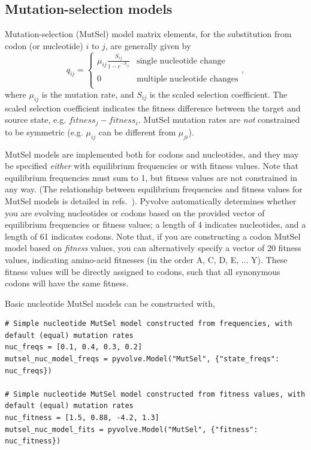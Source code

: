 \documentclass{article}
\begin{document}
\subsection{Mutation-selection models}\label{sec:mutsel_basic}
Mutation-selection (MutSel) model \citep{HB98} matrix elements, for the substitution from codon (or nucleotide) $i$ to $j$, are generally given by 
\begin{equation}
q_{ij} = \left\{ 
\begin{array}{rl}
	\mu_{ij} \frac{S_{ij}}{1-e^{-S_{ij}}} &\text{single nucleotide change} \\\\
	0                                  &\text{multiple nucleotide changes} \\             
\end{array} \right.,
\end{equation} where $\mu_{ij}$ is the mutation rate, and $S_{ij}$ is the scaled selection coefficient. The scaled selection coefficient indicates the fitness difference between the target and source state, e.g. $fitness_j - fitness_i$. MutSel mutation rates are \emph{not} constrained to be symmetric (e.g. $\mu_{ij}$ can be different from $\mu_{ji}$). 

MutSel models are implemented both for codons and nucleotides, and they may be specified \emph{either} with equilibrium frequencies or with fitness values. Note that equilibrium frequencies must sum to 1, but fitness values are not constrained in any way. (The relationship between equilibrium frequencies and fitness values for MutSel models is detailed in refs.\ \citep{HB98,SpielmanWilke2015}). Pyvolve automatically determines whether you are evolving nucleotides or codons based on the provided vector of equilibrium frequencies or fitness values; a length of 4 indicates nucleotides, and a length of 61 indicates codons. Note that, if you are constructing a codon MutSel model based on \emph{fitness} values, you can alternatively specify a vector of 20 fitness values, indicating amino-acid fitnesses (in the order A, C, D, E, ... Y). These fitness values will be directly assigned to codons, such that all synonymous codons will have the same fitness.


Basic nucleotide MutSel models can be constructed with,
\begin{lstlisting}
# Simple nucleotide MutSel model constructed from frequencies, with default (equal) mutation rates
nuc_freqs = [0.1, 0.4, 0.3, 0.2]
mutsel_nuc_model_freqs = pyvolve.Model("MutSel", {"state_freqs": nuc_freqs})

# Simple nucleotide MutSel model constructed from fitness values, with default (equal) mutation rates
nuc_fitness = [1.5, 0.88, -4.2, 1.3]
mutsel_nuc_model_fits = pyvolve.Model("MutSel", {"fitness": nuc_fitness})
\end{lstlisting}
\end{document}
